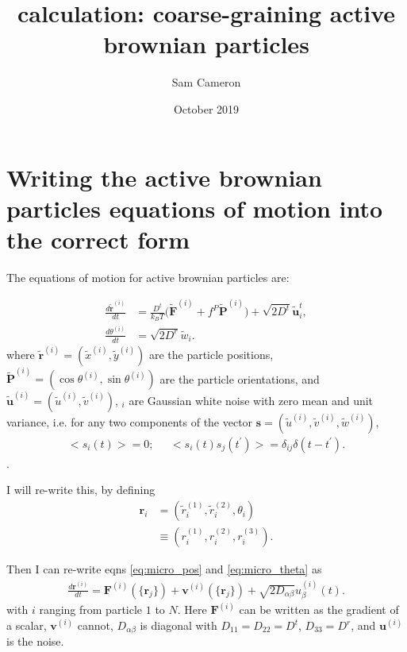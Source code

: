 \documentclass{article}
\title{calculation: coarse-graining active brownian particles}
\author{Sam Cameron}
\date{October 2019}
\begin{document}
\maketitle

\section{Writing the active brownian particles equations of motion into the correct form}



The equations of motion for active brownian particles are:

\begin{align}
  \frac{d\tilde{\bm{r}}^{(i)}}{dt}&=\frac{D^t}{k_BT}\big(\tilde{\bm{F}}^{(i)}
                                    +f^P\tilde{\bm{P}}^{(i)}\big)
                                    +\sqrt{2D^t}\tilde{\bm{u}}_i^t,\label{eq:micro_pos}\\
    \frac{d\theta^{(i)}}{dt}&=\sqrt{2D^r}\tilde{w}_i.\label{eq:micro_theta}
\end{align}
where $\tilde{\bm{r}}^{(i)}=(\tilde{x}^{(i)},\tilde{y}^{(i)})$ are the particle positions,
$\tilde{\bm{P}}^{(i)}=(\cos\theta^{(i)},\sin\theta^{(i)})$ are the particle orientations,
and $\tilde{\bm{u}}^{(i)}=(\tilde{u}^{(i)},\tilde{v}^{(i)})$, $_i$ are Gaussian white noise
with zero mean and unit variance, i.e. for any two components of the vector
$\bm{s}=(\tilde{u}^{(i)},\tilde{v}^{(i)},\tilde{w}^{(i)})$,
\begin{align}
  \big<s_i(t)\big>=0;\;\;\;\;\; \big<s_i(t)s_j(t^{\prime})\big>=
  \delta_{ij}\delta(t-t^{\prime}).
\end{align}.

I will re-write this, by defining
\begin{align}
    \bm{r}_i&=(\tilde{r}^{(1)}_i,\tilde{r}^{(2)}_i,\theta_i)\nonumber\\
    &\equiv(r^{(1)}_i,r^{(2)}_i,r^{(3)}_i).
\end{align}

Then I can re-write eqns \ref{eq:micro_pos} and \ref{eq:micro_theta} as
\begin{align}
  \frac{d\bm{r}^{(i)}}{dt}=\bm{F}^{(i)}(\{\bm{r}_j\})+\bm{v}^{(i)}(\{\bm{r}_j\})
  +\sqrt{2D_{\alpha\beta}}u_{\beta}^{(i)}(t).
\end{align}
with $i$ ranging from particle $1$ to $N$. Here $\bm{F}^{(i)}$ can be written as the gradient
of a scalar, $\bm{v}^{(i)}$ cannot, $D_{\alpha\beta}$ is diagonal with $D_{11}=D_{22}=D^t$,
$D_{33}=D^r$, and $\bm{u}^{(i)}$ is the noise.
\end{document}
